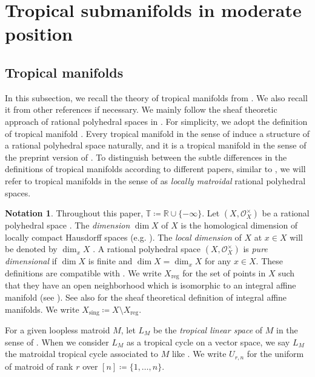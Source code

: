 \documentclass[a4paper,dvipdfmx,reqno,12pt]{amsart}
\theoremstyle{definition}
\newtheorem{notation}[theorem]{Notation}
\newcommand{\deq}{\coloneqq}
\numberwithin{equation}{section}
\begin{document}
\section{Tropical submanifolds in moderate position}
\label{section-on-rr-euler}
\subsection{Tropical manifolds}
In this subsection, we recall
the theory of tropical manifolds from
\cite{shaw2011tropical,MR3330789,mikhalkin2018tropical,MR4637248,demedrano2023chern}.
We also recall it from other references if necessary.
We mainly follow the sheaf theoretic approach of
rational polyhedral spaces in \cite{MR4637248}.
For simplicity, we adopt the definition of
tropical manifold
\cite[Definition 2.3]{demedrano2023chern}.
Every tropical manifold in the sense of
\cite{demedrano2023chern} induce a structure
of a rational polyhedral space naturally,
and it is a tropical manifold in the sense of
the preprint version
\cite[Definition 6.1]{gross2019sheaftheoretic}
of \cite{MR4637248}.
To distinguish between the subtle differences
in the definitions of tropical manifolds
according to different papers,
similar to \cite[]{MR4637248},
we will refer to tropical manifolds in the sense of
\cite[Definition 6.1]{gross2019sheaftheoretic}
as \emph{locally matroidal} rational polyhedral spaces.

\begin{notation}
Throughout this paper, $\mathbb{T}\deq 
\mathbb{R}\cup\{-\infty\}$.
Let $(X,\mathcal{O}_X^{\times})$ be a rational
polyhedral space \cite[Definition 2.2]{MR4637248}.
The \emph{dimension} $\dim X$ of $X$ is 
the homological dimension of locally compact
Hausdorff spaces (e.g.
\cite[Chapter III. Definition 9.4]{MR842190}).
The \emph{local dimension} of $X$ at $x\in X$
will be denoted by $\dim_x X$
\cite[Chapter III. Definition 9.10]{MR842190}.
A rational polyhedral space $(X,\mathcal{O}_X^{\times})$
is \emph{pure dimensional} if $\dim X$ is finite and
$\dim X=\dim_x X$ for any $x\in X$.
These definitions are compatible with
\cite[Definition 7.1.1]{mikhalkin2018tropical}.
We write $X_{\mathrm{reg}}$ for the set of points
in $X$ such that they have an open neighborhood 
which is isomorphic to an
integral affine manifold
\cite[Definition 2.7]{MR4637248}
(see \cite[]{MR3894860}).
See also \cite[Definition 3]{MR2181810}
for the sheaf theoretical
definition of integral affine manifolds.
We write $X_{\mathrm{sing}}\deq 
X\setminus X_{\mathrm{reg}}$.

For a given loopless matroid $M$, let
$L_M$ be the \emph{tropical linear space} of
$M$ in the sense of \cite[]{MR4637248}.
When we consider $L_M$ as a tropical cycle on a vector
space, we say $L_M$ the matroidal tropical cycle associated
to $M$ like \cite{demedrano2023chern}.
We write $U_{r,n}$ for the uniform of matroid of rank $r$ 
over $[n]\deq \{1,\ldots,n\}$.
\end{notation}
\end{document}
